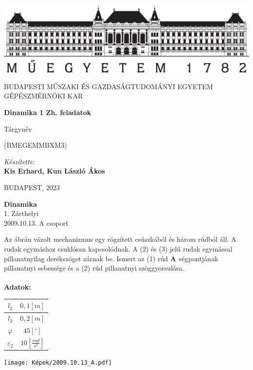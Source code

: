 \documentclass[11pt,a4paper]{article}
\begin{document}
\begin{titlepage}
\centering

\includegraphics[width=.8\textwidth]{bme_logo_nagy.jpg}

\vspace{1em}

{
\Large
BUDAPESTI MŰSZAKI ÉS GAZDASÁGTUDOMÁNYI EGYETEM GÉPÉSZMÉRNÖKI KAR
}

\vspace{10em}

{
\Huge
\textbf{Dinamika 1 Zh. feladatok}
}

\vspace{5em}

{
\huge
Tárgynév

\vspace{.2em}

\large
(BMEGEMMBXM3)
}

\vspace{4em}

{
\Large
\textit{Készítette:}\\
\vspace{.5em}
\textbf{Kis Erhard, Kun László Ákos}
}

\vspace{20em}

{
\large
BUDAPEST, 2023
}
\end{titlepage}
\newpage
{}
\begin{center}
    \textbf{\LARGE{Dinamika}}\\
    1. Zárthelyi\\
    2009.10.13. A csoport
\end{center}
Az ábrán vázolt mechanizmus egy rögzített csúszkából és három rúdból áll. A rudak egymáshoz
csuklósan kapcsolódnak. A (2) és (3) jelű rudak egymással pillanatnyilag derékszöget zárnak be.
Ismert az (1) rúd \textbf{A} végpontjának pillanatnyi sebessége és a (2) rúd pillanatnyi szöggyorsulása.\\\\
\textbf{Adatok:}\\
\begin{tabular}{| c | c |}
    \hline
    $l_2$ & $0,1 [m]$\\ 
    \hline
    $l_3$ &  $0,2 [m]$\\  
    \hline
    $\varphi$ & $45 [^\circ]$\\  
    \hline
    $\varepsilon_2$ & $10 \left[\frac{rad}{s^2}\right]$\\
    \hline
\end{tabular}
\begin{center}
    \texttt{[image: Képek/2009.10.13\_A.pdf]}
\end{center}
\end{document}
